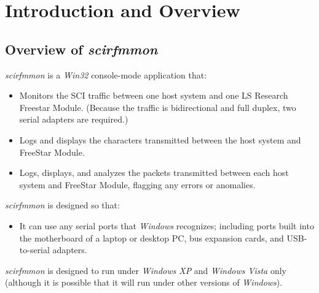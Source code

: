 \documentclass[letterpaper,10pt,titlepage]{article}
\newcommand{\productname}{scirfmmon}
\newcommand{\productnameemph}{\emph{\productname}}
\begin{document}
\section{Introduction and Overview}
\label{siov0}


\subsection{Overview of \productnameemph{}}
\label{siov0:sovw0}

\index{\productname@\productnameemph{}}\productnameemph{} is a \emph{Win32} console-mode
application that:

\begin{itemize}
\item Monitors the SCI traffic between one host system and one LS Research Freestar 
      Module.  
      (Because the traffic is bidirectional and full duplex, two serial adapters are 
      required.)
\item Logs and displays the characters transmitted between the host system and FreeStar Module.
\item Logs, displays, and analyzes the packets transmitted between each host system and FreeStar 
      Module, flagging any errors or anomalies.
\end{itemize}

\productnameemph{} is designed so that:

\begin{itemize}
\item It can use any serial ports that \emph{Windows} recognizes; including ports built into
      the motherboard of a laptop 
      or desktop PC, bus expansion cards, and USB-to-serial adapters.
\end{itemize}

\productnameemph{} is designed to run under 
\emph{Windows XP} 
and \emph{Windows Vista} only (although
it is possible that it will run under other versions of 
\emph{Windows}).
\end{document}

